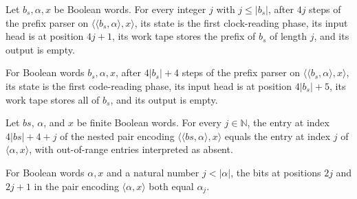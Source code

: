 \begin{lemma}
\label{Turing.timedPrefix_clock}
\leanok
{}
Let $b_s,\alpha,x$ be Boolean words. For every integer $j$ with $j\le |b_s|$, after $4j$
steps of the prefix parser on $\langle\langle b_s,\alpha\rangle,x\rangle$, its state is
the first clock-reading phase, its input head is at position $4j+1$, its work tape
stores the prefix of $b_s$ of length $j$, and its output is empty.
\end{lemma}

\begin{lemma}
\label{Turing.timedPrefix_clock_end}
\leanok
{}
For Boolean words $b_s,\alpha,x$, after $4|b_s|+4$ steps of the prefix parser on
$\langle\langle b_s,\alpha\rangle,x\rangle$, its state is the first code-reading phase,
its input head is at position $4|b_s|+5$, its work tape stores all of $b_s$, and its
output is empty.
\end{lemma}

\begin{lemma}
\label{Turing.timed_code_get}
\leanok
{}
Let $bs$, $\alpha$, and $x$ be finite Boolean words. For every $j\in\mathbb{N}$, the
entry at index $4|bs|+4+j$ of the nested pair encoding $\langle\langle
bs,\alpha\rangle,x\rangle$ equals the entry at index $j$ of $\langle\alpha,x\rangle$,
with out-of-range entries interpreted as absent.
\end{lemma}

\begin{lemma}
\label{Turing.timed_pair_get}
\leanok
{}
For Boolean words $\alpha,x$ and a natural number $j<|\alpha|$, the bits at positions
$2j$ and $2j+1$ in the pair encoding $\langle\alpha,x\rangle$ both equal $\alpha_j$.
\end{lemma}

